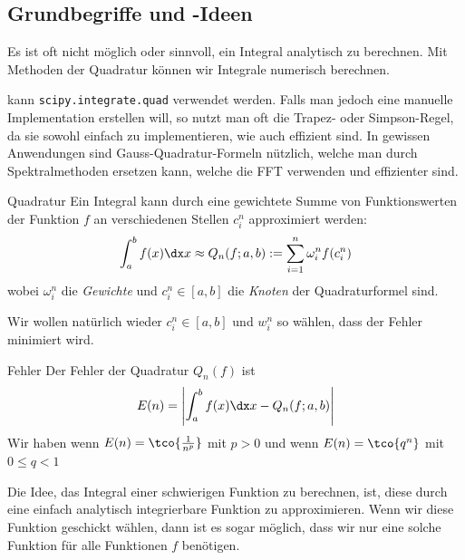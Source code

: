 
\setcounter{subsection}{2}
\subsection{Grundbegriffe und -Ideen}
Es ist oft nicht möglich oder sinnvoll, ein Integral analytisch zu berechnen.
Mit Methoden der Quadratur können wir Integrale numerisch berechnen.

\innumpy kann \texttt{scipy.integrate.quad} verwendet werden.
Falls man jedoch eine manuelle Implementation erstellen will, so nutzt man oft die Trapez- oder Simpson-Regel, da sie sowohl einfach zu implementieren, wie auch effizient sind.
In gewissen Anwendungen sind Gauss-Quadratur-Formeln nützlich, welche man durch Spektralmethoden ersetzen kann, welche die FFT verwenden und effizienter sind.

\begin{definition}[]{Quadratur}
    Ein Integral kann durch eine gewichtete Summe von Funktionswerten der Funktion $f$ an verschiedenen Stellen $c_i^n$ approximiert werden:
    \begin{align*}
        \int_{a}^{b} f(x) \dx x \approx Q_n(f; a, b) := \sum_{i = 1}^{n} \omega_i^n f(c_i^n)
    \end{align*}
    wobei $\omega_i^n$ die \textit{Gewichte} und $c_i^n \in [a, b]$ die \textit{Knoten} der Quadraturformel sind.
\end{definition}

Wir wollen natürlich wieder $c_i^n \in [a, b]$ und $w_i^n$ so wählen, dass der Fehler minimiert wird.
\begin{definition}[]{Fehler}
    Der Fehler der Quadratur $Q_n(f)$ ist
    \begin{align*}
        E(n) = \left| \int_{a}^{b} f(x) \dx x - Q_n(f; a, b) \right|
    \end{align*}
    Wir haben  wenn $E(n) = \tco{\frac{1}{n^p}}$ mit $p > 0$ und
     wenn $E(n) = \tco{q^n}$ mit $0 \leq q < 1$
\end{definition}

Die Idee, das Integral einer schwierigen Funktion zu berechnen, ist, diese durch eine einfach analytisch integrierbare Funktion zu approximieren.
Wenn wir diese Funktion geschickt wählen, dann ist es sogar möglich, dass wir nur eine solche Funktion für alle Funktionen $f$ benötigen.

